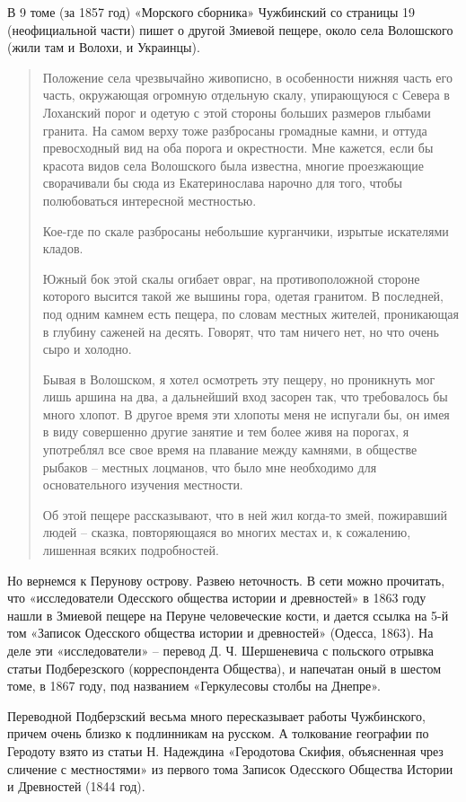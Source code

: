 В 9 томе (за 1857 год) «Морского сборника» Чужбинский со страницы 19 (неофициальной части) пишет о другой Змиевой пещере, около села Волошского (жили там и Волохи, и Украинцы).

\begin{quotation}
Положение села чрезвычайно живописно, в особенности нижняя часть его часть, окружающая огромную отдельную скалу, упирающуюся с Севера в Лоханский порог и одетую с этой стороны больших размеров глыбами гранита. На самом верху тоже разбросаны громадные камни, и оттуда превосходный вид на оба порога и окрестности. Мне кажется, если бы красота видов села Волошского была известна, многие проезжающие сворачивали бы сюда из Екатеринослава нарочно для того, чтобы полюбоваться интересной местностью.

Кое-где по скале разбросаны небольшие курганчики, изрытые искателями кладов.

Южный бок этой скалы огибает овраг, на противоположной стороне которого высится такой же вышины гора, одетая гранитом. В последней, под одним камнем есть пещера, по словам местных жителей, проникающая в глубину саженей на десять. Говорят, что там ничего нет, но что очень сыро и холодно.

Бывая в Волошском, я хотел осмотреть эту пещеру, но проникнуть мог лишь аршина на два, а дальнейший вход засорен так, что требовалось бы много хлопот. В другое время эти хлопоты меня не испугали бы, он имея в виду совершенно другие занятие и тем более живя на порогах, я употреблял все свое время на плавание между камнями, в обществе рыбаков – местных лоцманов, что было мне необходимо для основательного изучения местности.

Об этой пещере рассказывают, что в ней жил когда-то змей, пожиравший людей – сказка, повторяющаяся во многих местах и, к сожалению, лишенная всяких подробностей.
\end{quotation}

Но вернемся к Перунову острову. Развею неточность. В сети можно прочитать, что «исследователи Одесского общества истории и древностей» в 1863 году нашли в Змиевой пещере на Перуне человеческие кости, и дается ссылка на 5-й том «Записок Одесского общества истории и древностей» (Одесса, 1863). На деле эти «исследователи» – перевод Д. Ч. Шершеневича с польского отрывка статьи Подберезского (корреспондента Общества), и напечатан оный в шестом томе, в 1867 году, под названием «Геркулесовы столбы на Днепре». 

Переводной Подберзский весьма много пересказывает работы Чужбинского, причем очень близко к подлинникам на русском. А толкование географии по Геродоту взято из статьи Н. Надеждина «Геродотова Скифия, объясненная чрез сличение с местностями» из первого тома Записок Одесского Общества Истории и Древностей (1844 год).

